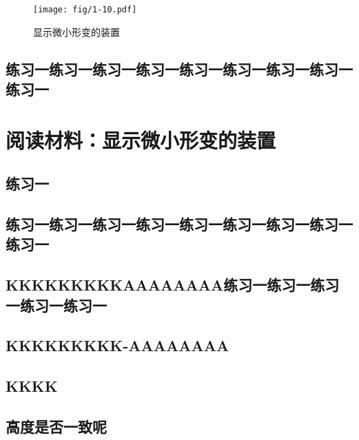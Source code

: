 \begin{figure}[htp]
\centering
\texttt{[image: fig/1-10.pdf]}
\caption{显示微小形变的装置
}
\end{figure}

\newpage

\subsection{练习一练习一练习一练习一练习一练习一练习一练习一练习一}


\makeatletter
{}
\makeatother

\section*[阅读材料阅读材料]{阅读材料：显示微小形变的装置}



\subsection*{练习一}

\subsection*{练习一练习一练习一练习一练习一练习一练习一练习一练习一}


\subsection*{KKKKKKKKKAAAAAAAA练习一练习一练习一练习一练习一}

\subsection*{KKKKKKKKK-AAAAAAAA}

\subsection*{KKKK}


\subsection*{高度是否一致呢}


